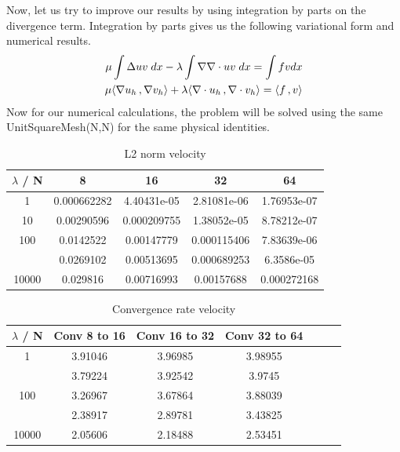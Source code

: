 \documentclass[a4paper,norsk]{article}
\begin{document}
\newpage
Now, let us try to improve our results by using integration by parts on the divergence term.
Integration by parts gives us the following variational form and numerical results.
\begin{align*}
\mu \int \Delta u v \hspace{1mm} dx - \lambda \int \nabla \nabla \cdot u v \hspace{1mm} dx = \int f v dx\\ 
\mu \langle \nabla u_h \,, \nabla v_h \rangle + \lambda \langle \nabla \cdot u_h \,, \nabla \cdot v_h \rangle 
= \langle f \,, v \rangle
\end{align*}
Now for our numerical calculations, the problem will be solved using the same 
UnitSquareMesh(N,N)  for the same physical identities.
\begin{table}[ht]
\caption {L2 norm velocity} 
\centering
\begin{tabular}{c|cccc}
\hline
\rowcolor{LightCyan}
$\lambda$ / N  & 8 & 16 & 32 & 64\\
\hline
 1     & 0.000662282 & 4.40431e-05 & 2.81081e-06 & 1.76953e-07 \\ \hline 
 \rowcolor{LightCyan} 
10    & 0.00290596  & 0.000209755 & 1.38052e-05 & 8.78212e-07 \\ \hline
100   & 0.0142522   & 0.00147779  & 0.000115406 & 7.83639e-06 \\ \hline
\rowcolor{LightCyan} \hline
1000  & 0.0269102   & 0.00513695  & 0.000689253 & 6.3586e-05  \\ \hline
10000 & 0.029816    & 0.00716993  & 0.00157688  & 0.000272168 \\
\hline
\end{tabular}
\end{table}
\begin{table}[ht]
\caption {Convergence rate velocity} 
\centering
\begin{tabular}{c|cccccc}
\hline
\rowcolor{LightCyan}
$\lambda$ / N  & Conv 8 to 16  &  Conv 16 to 32 &  Conv 32 to 64\\
\hline
1     & 3.91046 & 3.96985 & 3.98955 &  \\ \hline
\rowcolor{LightCyan} \hline
10    & 3.79224 & 3.92542 & 3.9745  &  \\ \hline
100   & 3.26967 & 3.67864 & 3.88039 &  \\ \hline
\rowcolor{LightCyan} \hline
1000  & 2.38917 & 2.89781 & 3.43825 &  \\ \hline
10000 & 2.05606 & 2.18488 & 2.53451 & \\
\hline
\end{tabular}
\end{table}
\end{document}

